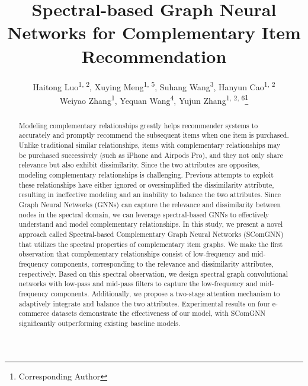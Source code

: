 \documentclass[letterpaper]{article} %
\title{Spectral-based Graph Neural Networks for Complementary Item Recommendation}
\author {
    Haitong Luo\textsuperscript{\rm 1, \rm 2},
    Xuying Meng\textsuperscript{\rm 1, \rm 5},
    Suhang Wang\textsuperscript{\rm 3},
    Hanyun Cao\textsuperscript{\rm 1, \rm 2}\\
    Weiyao Zhang\textsuperscript{\rm 1},
    Yequan Wang\textsuperscript{\rm 4},
    Yujun Zhang\textsuperscript{\rm 1, \rm 2, \rm 6}\thanks{Corresponding Author}
}
\begin{document}
\maketitle

\begin{abstract}
Modeling complementary relationships greatly helps recommender systems to accurately and promptly recommend the subsequent items when one item is purchased. Unlike traditional similar relationships, items with complementary relationships may be purchased successively (such as iPhone and Airpods Pro), and they not only share relevance but also exhibit dissimilarity. Since the two attributes are opposites, modeling complementary relationships is challenging. Previous attempts to exploit these relationships have either ignored or oversimplified the dissimilarity attribute, resulting in ineffective modeling and an inability to balance the two attributes. Since Graph Neural Networks (GNNs) can capture the relevance and dissimilarity between nodes in the spectral domain, we can leverage spectral-based GNNs to effectively understand and model complementary relationships. 
In this study, we present a novel approach called Spectral-based Complementary Graph Neural Networks (SComGNN) that utilizes the spectral properties of complementary item graphs. We make the first observation that complementary relationships consist of low-frequency and mid-frequency components, corresponding to the relevance and dissimilarity attributes, respectively. Based on this spectral observation, we design spectral graph convolutional networks with low-pass and mid-pass filters to capture the low-frequency and mid-frequency components. Additionally, we propose a two-stage attention mechanism to adaptively integrate and balance the two attributes. Experimental results on four e-commerce datasets demonstrate the effectiveness of our model, with SComGNN significantly outperforming existing baseline models.




\end{abstract}
\end{document}
